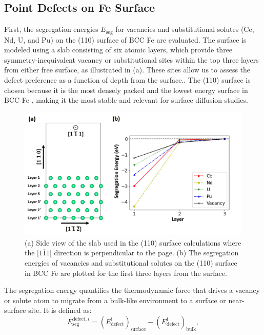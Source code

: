 \documentclass[preprint,12pt]{elsarticle}
\begin{document}
\FloatBarrier
\subsection{Point Defects on Fe Surface}

\noindent First, the segregation energies \( E_{\text{seg}}\) for vacancies and substitutional solutes (Ce, Nd, U, and Pu) on the (110) surface of BCC Fe are evaluated. The surface is modeled using a slab consisting of six atomic layers, which provide three symmetry-inequivalent vacancy or substitutional sites within the top three layers from either free surface, as illustrated in (a). These sites allow us to assess the defect preference as a function of depth from the surface.. The (110) surface is chosen because it is the most densely packed and the lowest energy surface in BCC Fe \cite{tran2016surface}, making it the most stable and relevant for surface diffusion studies.

\begin{figure}[!ht]
    \centering
    \includegraphics[width=\linewidth]{seg_surface.jpg}
    \caption{(a) Side view of the slab used in the (110) surface calculations where the [$1\overline{1}1$] direction is perpendicular to the page. (b) The segregation energies of vacancies and substitutional solutes on the (110) surface in BCC Fe are plotted for the first three layers from the surface. }
    \label{fig:surface_seg}
\end{figure}


The segregation energy quantifies the thermodynamic force that drives a vacancy or solute atom to migrate from a bulk-like environment to a surface or near-surface site. It is defined as:
\begin{equation}
    E_{\text{seg}}^{\text{defect},i} = (E_{\text{defect}}^{\text{i}})_{\text{surface}} - (E_{\text{defect}}^{\text{i}})_{\text{bulk}},
\end{equation}
\end{document}
